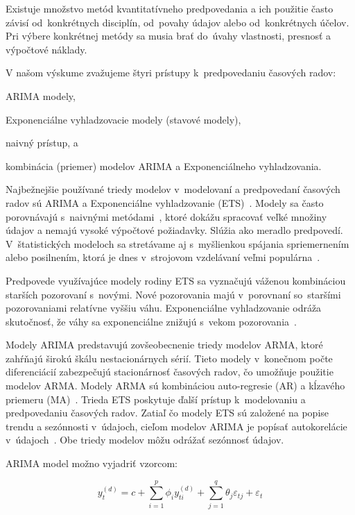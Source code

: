 \documentclass[thesismargins, thesislinespacing, openright, upjsfrontpage]{rnthesis}
\begin{document}
Existuje množstvo metód kvantitatívneho predpovedania a ich použitie často závisí od~konkrétnych disciplín, od~povahy údajov alebo od~konkrétnych účelov. Pri výbere konkrétnej metódy sa musia brať do~úvahy vlastnosti, presnosť a výpočtové náklady.

V našom výskume zvažujeme štyri prístupy k~predpovedaniu časových radov: 
\begin{compactenum}
    \item ARIMA modely,
    \item Exponenciálne vyhladzovacie modely (stavové modely),
    \item naivný prístup, a 
    \item kombinácia (priemer) modelov ARIMA a Exponenciálneho vyhladzovania.
\end{compactenum}

Najbežnejšie používané triedy modelov v~modelovaní a predpovedaní časových radov sú ARIMA a Exponenciálne vyhladzovanie (ETS)~\cite{hyndman2018forecasting}. Modely sa často porovnávajú s~naivnými metódami~\cite{brockwell2016introduction, box2015time}, ktoré dokážu spracovať veľké množiny údajov a nemajú vysoké výpočtové požiadavky. Slúžia ako meradlo predpovedí. V~štatistických modeloch sa stretávame aj s~myšlienkou spájania spriemernením alebo posilnením, ktorá je dnes v~strojovom vzdelávaní veľmi populárna~\cite{Husak2018survey}. 

Predpovede využívajúce modely rodiny ETS sa vyznačujú váženou kombináciou starších pozorovaní s~novými. Nové pozorovania majú v~porovnaní so~staršími pozorovaniami relatívne vyššiu váhu. Exponenciálne vyhladzovanie odráža skutočnosť, že váhy sa exponenciálne znižujú s~vekom pozorovania~\cite{hyndman2018forecasting,brockwell2016introduction}.

Modely ARIMA predstavujú zovšeobecnenie triedy modelov ARMA, ktoré zahŕňajú širokú škálu nestacionárnych sérií. Tieto modely v~konečnom počte diferenciácií zabezpečujú stacionárnosť časových radov, čo umožňuje použitie modelov ARMA. Modely ARMA sú kombináciou auto-regresie (AR) a kĺzavého priemeru (MA)~\cite{box2015time}. Trieda ETS poskytuje ďalší prístup k~modelovaniu a predpovedaniu časových radov. Zatiaľ čo modely ETS sú založené na popise trendu a sezónnosti v~údajoch, cieľom modelov ARIMA je popísať autokorelácie v~údajoch~\cite{hyndman2018forecasting}. Obe triedy modelov môžu odrážať sezónnosť údajov.

ARIMA model možno vyjadriť vzorcom:
 
\begin{equation}
y_t^{(d)} = c + \sum_{i = 1} ^ {p} \phi_{i} y_{ti}^{(d)} + \sum_{j = 1}^{q} \theta_j \varepsilon_{tj} + \varepsilon_t
\end{equation}
 
\end{document}
